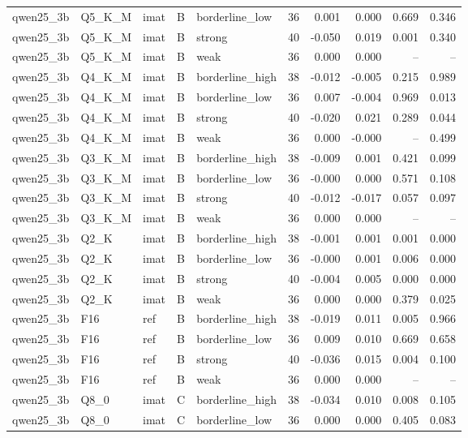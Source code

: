 \begin{tabular}{lllllrrrrr}
qwen25\_3b & Q5\_K\_M & imat & B & borderline\_low & 36 & 0.001 & 0.000 & 0.669 & 0.346 \\
qwen25\_3b & Q5\_K\_M & imat & B & strong & 40 & -0.050 & 0.019 & 0.001 & 0.340 \\
qwen25\_3b & Q5\_K\_M & imat & B & weak & 36 & 0.000 & 0.000 & -- & -- \\
qwen25\_3b & Q4\_K\_M & imat & B & borderline\_high & 38 & -0.012 & -0.005 & 0.215 & 0.989 \\
qwen25\_3b & Q4\_K\_M & imat & B & borderline\_low & 36 & 0.007 & -0.004 & 0.969 & 0.013 \\
qwen25\_3b & Q4\_K\_M & imat & B & strong & 40 & -0.020 & 0.021 & 0.289 & 0.044 \\
qwen25\_3b & Q4\_K\_M & imat & B & weak & 36 & 0.000 & -0.000 & -- & 0.499 \\
qwen25\_3b & Q3\_K\_M & imat & B & borderline\_high & 38 & -0.009 & 0.001 & 0.421 & 0.099 \\
qwen25\_3b & Q3\_K\_M & imat & B & borderline\_low & 36 & -0.000 & 0.000 & 0.571 & 0.108 \\
qwen25\_3b & Q3\_K\_M & imat & B & strong & 40 & -0.012 & -0.017 & 0.057 & 0.097 \\
qwen25\_3b & Q3\_K\_M & imat & B & weak & 36 & 0.000 & 0.000 & -- & -- \\
qwen25\_3b & Q2\_K & imat & B & borderline\_high & 38 & -0.001 & 0.001 & 0.001 & 0.000 \\
qwen25\_3b & Q2\_K & imat & B & borderline\_low & 36 & -0.000 & 0.001 & 0.006 & 0.000 \\
qwen25\_3b & Q2\_K & imat & B & strong & 40 & -0.004 & 0.005 & 0.000 & 0.000 \\
qwen25\_3b & Q2\_K & imat & B & weak & 36 & 0.000 & 0.000 & 0.379 & 0.025 \\
qwen25\_3b & F16 & ref & B & borderline\_high & 38 & -0.019 & 0.011 & 0.005 & 0.966 \\
qwen25\_3b & F16 & ref & B & borderline\_low & 36 & 0.009 & 0.010 & 0.669 & 0.658 \\
qwen25\_3b & F16 & ref & B & strong & 40 & -0.036 & 0.015 & 0.004 & 0.100 \\
qwen25\_3b & F16 & ref & B & weak & 36 & 0.000 & 0.000 & -- & -- \\
qwen25\_3b & Q8\_0 & imat & C & borderline\_high & 38 & -0.034 & 0.010 & 0.008 & 0.105 \\
qwen25\_3b & Q8\_0 & imat & C & borderline\_low & 36 & 0.000 & 0.000 & 0.405 & 0.083 \\

\end{tabular}

